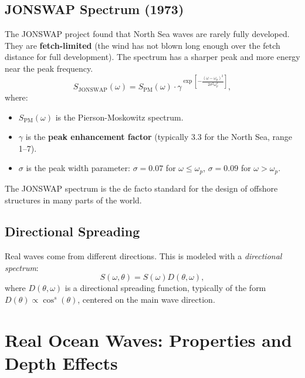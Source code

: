\documentclass[11pt,letterpaper]{article}
\begin{document}
\subsection{JONSWAP Spectrum (1973)}
The JONSWAP project found that North Sea waves are rarely fully developed. They are \textbf{fetch-limited} (the wind has not blown long enough over the fetch distance for full development). The spectrum has a sharper peak and more energy near the peak frequency.
\begin{equation}
S_{\text{JONSWAP}}(\omega) = S_{\text{PM}}(\omega) \cdot \gamma^{\exp\left[-\frac{(\omega - \omega_p)^2}{2\sigma^2\omega_p^2}\right]},
\end{equation}
where:
\begin{itemize}
    \item $S_{\text{PM}}(\omega)$ is the Pierson-Moskowitz spectrum.
    \item $\gamma$ is the \textbf{peak enhancement factor} (typically 3.3 for the North Sea, range 1–7).
    \item $\sigma$ is the peak width parameter: $\sigma = 0.07$ for $\omega \leq \omega_p$, $\sigma = 0.09$ for $\omega > \omega_p$.
\end{itemize}
The JONSWAP spectrum is the de facto standard for the design of offshore structures in many parts of the world.

\subsection{Directional Spreading}
Real waves come from different directions. This is modeled with a \emph{directional spectrum}:
\begin{equation}
S(\omega, \theta) = S(\omega) D(\theta, \omega),
\end{equation}
where $D(\theta, \omega)$ is a directional spreading function, typically of the form $D(\theta) \propto \cos^s(\theta)$, centered on the main wave direction.

\section{Real Ocean Waves: Properties and Depth Effects}
\end{document}
